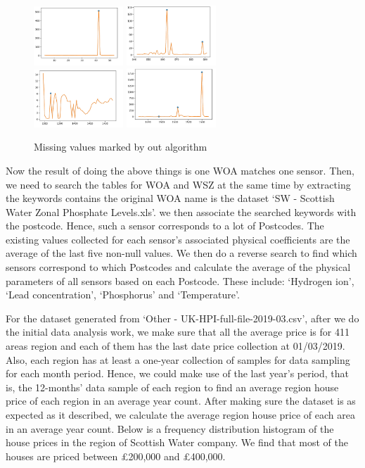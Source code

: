 \documentclass[11pt,twoside]{article}
\numberwithin{Theorem}{section}
\numberwithin{Definition}{section}
\numberwithin{Lemma}{section}
\numberwithin{Algorithm}{section}
\numberwithin{equation}{section}
\begin{document}
\begin{figure}[!ht]
    \centering
    \includegraphics[width=0.3\textwidth]{p4.png}
    \includegraphics[width=0.3\textwidth]{p5.png}\\
    \includegraphics[width=0.3\textwidth]{p6.png}
    \includegraphics[width=0.3\textwidth]{p7.png}
    \caption{Missing values marked by out algorithm}
    \end{figure}

Now the result of doing the above things is one WOA matches one sensor. Then, we need to search the tables for WOA and WSZ at the same time by extracting the keywords contains the original WOA name is the dataset ‘SW - Scottish Water Zonal Phosphate Levels.xls’. we then associate the searched keywords with the postcode. Hence, such a sensor corresponds to a lot of Postcodes. The existing values collected for each sensor's associated physical coefficients are the average of the last five non-null values. We then do a reverse search to find which sensors correspond to which Postcodes and calculate the average of the physical parameters of all sensors based on each Postcode. These include: ‘Hydrogen ion’, ‘Lead concentration’, ‘Phosphorus’ and ‘Temperature’.

For the dataset generated from ‘Other - UK-HPI-full-file-2019-03.csv’, after we do the initial data analysis work, we make sure that all the average price is for 411 areas region and each of them has the last date price collection at 01/03/2019. Also, each region has at least a one-year collection of samples for data sampling for each month period. Hence, we could make use of the last year's period, that is, the 12-months’ data sample of each region to find an average region house price of each region in an average year count. After making sure the dataset is as expected as it described, we calculate the average region house price of each area in an average year count. Below is a frequency distribution histogram of the house prices in the region of Scottish Water company. We find that most of the houses are priced between £200,000 and £400,000.
\end{document}
